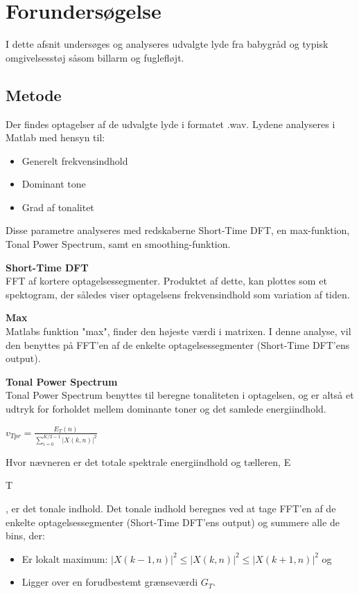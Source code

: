 \section{Forundersøgelse}

I dette afsnit undersøges og analyseres udvalgte lyde fra babygråd og typisk omgivelsesstøj såsom billarm og fuglefløjt.

\subsection{Metode}
Der findes optagelser af de udvalgte lyde i formatet .wav. Lydene analyseres i Matlab med hensyn til:
\begin{itemize}
	\item Generelt frekvensindhold
	\item Dominant tone
	\item Grad af tonalitet
\end{itemize} 

Disse parametre analyseres med redskaberne Short-Time DFT, en max-funktion, Tonal Power Spectrum, samt en smoothing-funktion.

\textbf{Short-Time DFT} \\
FFT af kortere optagelsessegmenter. Produktet af dette, kan plottes som et spektogram, der således viser optagelsens frekvensindhold som variation af tiden.

\textbf{Max} \\
Matlabs funktion "max", finder den højeste værdi i matrixen. I denne analyse, vil den benyttes på FFT'en af de enkelte optagelsessegmenter (Short-Time DFT'ens output).

\textbf{Tonal Power Spectrum} \\
Tonal Power Spectrum benyttes til beregne tonaliteten i optagelsen, og er altså et udtryk for forholdet mellem dominante toner og det samlede energiindhold. 
\begin{center}
${ v }_{ Tpr }=\frac { { E }_{ T }(n) }{ \sum _{ i=0 }^{ K/2-1 }{ { \left| X(k,n) \right|  }^{ 2 } }  } $
\end{center}

Hvor nævneren er det totale spektrale energiindhold og tælleren, E\begin{tiny}T\end{tiny}, er det tonale indhold. Det tonale indhold beregnes ved at tage FFT'en af de enkelte optagelsessegmenter (Short-Time DFT'ens output) og summere alle de bins, der:
\begin{itemize}
	\item Er lokalt maximum: ${ \left| X(k-1,n) \right|  }^{ 2 }\le { \left| X(k,n) \right|  }^{ 2 }\le { \left| X(k+1,n) \right|  }^{ 2 }$ og
	\item Ligger over en forudbestemt grænseværdi ${ G }_{ T }$.
\end{itemize} 	

